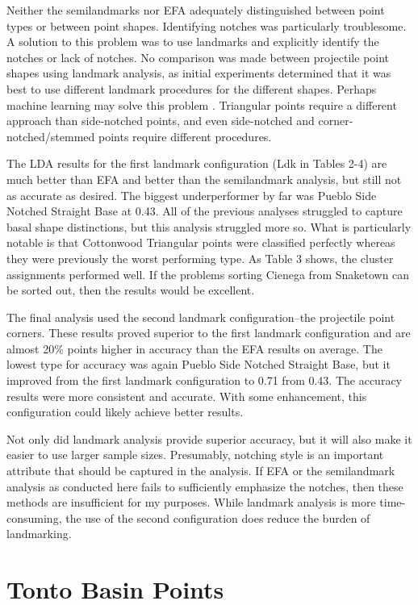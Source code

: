 \documentclass[a4paper]{article}
\begin{document}
Neither the semilandmarks nor EFA adequately distinguished between point types or between point shapes. Identifying notches was particularly troublesome. A solution to this problem was to use landmarks and explicitly identify the notches or lack of notches. No comparison was made between projectile point shapes using landmark analysis, as initial experiments determined that it was best to use different landmark procedures for the different shapes. Perhaps machine learning may solve this problem \autocites[see][]{Castillo_Flores2019-cs,MacLeod2018-aj,Nash2016-mc}. Triangular points require a different approach than side-notched points, and even side-notched and corner-notched/stemmed points require different procedures.

The LDA results for the first landmark configuration (Ldk in Tables 2-4) are much better than EFA and better than the semilandmark analysis, but still not as accurate as desired. The biggest underperformer by far was Pueblo Side Notched Straight Base at 0.43. All of the previous analyses struggled to capture basal shape distinctions, but this analysis struggled more so. What is particularly notable is that Cottonwood Triangular points were classified perfectly whereas they were previously the worst performing type. As Table 3 shows, the cluster assignments performed well. If the problems sorting Cienega from Snaketown can be sorted out, then the results would be excellent.

The final analysis used the second landmark configuration--the projectile point corners. These results proved superior to the first landmark configuration and are almost 20\% points higher in accuracy than the EFA results on average. The lowest type for accuracy was again Pueblo Side Notched Straight Base, but it improved from the first landmark configuration to 0.71 from 0.43. The accuracy results were more consistent and accurate. With some enhancement, this configuration could likely achieve better results.

Not only did landmark analysis provide superior accuracy, but it will also make it easier to use larger sample sizes. Presumably, notching style is an important attribute that should be captured in the analysis. If EFA or the semilandmark analysis as conducted here fails to sufficiently emphasize the notches, then these methods are insufficient for my purposes. While landmark analysis is more time-consuming, the use of the second configuration does reduce the burden of landmarking.

\hypertarget{tonto-basin-points}{%
\section*{Tonto Basin Points}\label{tonto-basin-points}}
\end{document}
